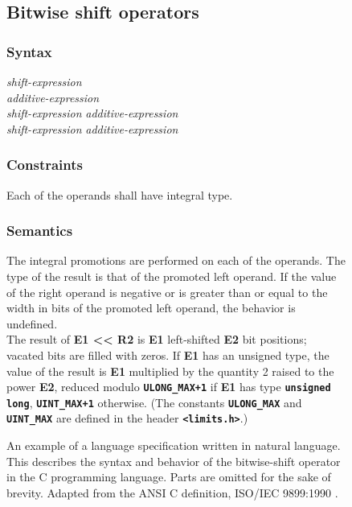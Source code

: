 \begin{figure}
  \begin{mdframed}
    \subsection*{Bitwise shift operators}

    \subsubsection*{Syntax}
    \textit{shift-expression}\\
    \hspace*{0.3cm} \textit{additive-expression}\\
    \hspace*{0.3cm} \textit{shift-expression} \textbt{<<} \textit{additive-expression}\\
    \hspace*{0.3cm} \textit{shift-expression} \textbt{>>} \textit{additive-expression}

    \subsubsection*{Constraints}
    Each of the operands shall have integral type.

    \subsubsection*{Semantics}
    The integral promotions are performed on each of the operands. The type of the result is that of the promoted left operand. If the value of the right operand is negative or is greater than or equal to the width in bits of the promoted left operand, the behavior is undefined.\\

    \noindent The result of \textbf{E1 << R2} is \textbf{E1} left-shifted \textbf{E2} bit positions; vacated bits are filled with zeros. If \textbf{E1} has an unsigned type, the value of the result is \textbf{E1} multiplied by the quantity 2 raised to the power \textbf{E2}, reduced modulo \texttt{\textbf{ULONG\_MAX+1}} if \textbf{E1} has type \texttt{\textbf{unsigned long}}, \texttt{\textbf{UINT\_MAX+1}} otherwise. (The constants \texttt{\textbf{ULONG\_MAX}} and \texttt{\textbf{UINT\_MAX}} are defined in the header \texttt{\textbf{<limits.h>}}.)\\

    \noindent [...]
  \end{mdframed}
  \caption{An example of a language specification written in natural language. This describes the syntax and behavior of the bitwise-shift operator in the C programming language. Parts are omitted for the sake of brevity. Adapted from the ANSI C definition, ISO/IEC 9899:1990 \cite{ISO:1990:IIP}.}
  \label{fig:background_c_snippet}
\end{figure}

